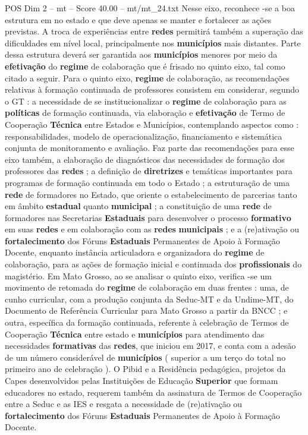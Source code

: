 \begin{textsample}{POS Dim 2 – mt – Score 40.00 – mt/mt\_24.txt}
Nesse eixo, reconhece -se a boa estrutura em no estado e que deve apenas se manter e fortalecer as ações previstas.
A troca de experiências entre \textbf{redes} permitirá também a superação das dificuldades em nível local, principalmente nos \textbf{municípios} mais distantes.
Parte dessa estrutura deverá ser garantida aos \textbf{municípios} menores por meio da \textbf{efetivação} do \textbf{regime} de colaboração que é frisado no quinto eixo, tal como citado a seguir.
Para o quinto eixo, \textbf{regime} de colaboração, as recomendações relativas à formação continuada de professores consistem em considerar, segundo o GT : a necessidade de se institucionalizar o \textbf{regime} de colaboração para as \textbf{políticas} de formação continuada, via elaboração e \textbf{efetivação} de Termo de Cooperação \textbf{Técnica} entre Estados e Municípios, contemplando aspectos como : responsabilidades, modelo de operacionalização, financiamento e sistemática conjunta de monitoramento e avaliação.
Faz parte das recomendações para esse eixo também, a elaboração de diagnósticos das necessidades de formação dos professores das \textbf{redes} ; a definição de \textbf{diretrizes} e temáticas importantes para programas de formação continuada em todo o Estado ; a estruturação de uma \textbf{rede} de formadores no Estado, que oriente o estabelecimento de parcerias tanto em âmbito \textbf{estadual} quanto \textbf{municipal} ; a constituição de uma \textbf{rede} de formadores nas Secretarias \textbf{Estaduais} para desenvolver o processo \textbf{formativo} em suas \textbf{redes} e em colaboração com as \textbf{redes} \textbf{municipais} ; e a (re)ativação ou \textbf{fortalecimento} dos Fóruns \textbf{Estaduais} Permanentes de Apoio à Formação Docente, enquanto instância articuladora e organizadora do \textbf{regime} de colaboração, para as ações de formação inicial e continuada dos \textbf{profissionais} do magistério.
Em Mato Grosso, ao se analisar o quinto eixo, verifica -se um movimento de retomada do \textbf{regime} de colaboração em duas frentes : uma, de cunho curricular, com a produção conjunta da Seduc-MT e da Undime-MT, do Documento de Referência Curricular para Mato Grosso a partir da BNCC ; e outra, específica da formação continuada, referente à celebração de Termos de Cooperação \textbf{Técnica} entre estado e \textbf{municípios} para atendimento das necessidades \textbf{formativas} das \textbf{redes}, que iniciou em 2017, e conta com a adesão de um número considerável de \textbf{municípios} ( superior a um terço do total no primeiro ano de celebração ).
O Pibid e a Residência pedagógica, projetos da Capes desenvolvidos pelas Instituições de Educação \textbf{Superior} que formam educadores no estado, requerem também da assinatura de Termos de Cooperação entre a Seduc e as IES e resgata a necessidade de (re)ativação ou \textbf{fortalecimento} dos Fóruns \textbf{Estaduais} Permanentes de Apoio à Formação Docente.

\end{textsample}
